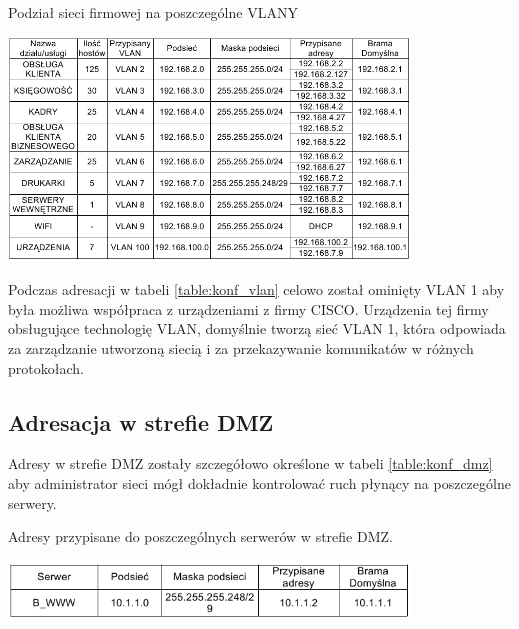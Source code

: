 \documentclass{report}
\begin{document}
\begin{table}[H]
\caption{Podział sieci firmowej na poszczególne VLANY}
\label{table:konf_vlan}
 \centering
      \includegraphics[width=0.8\textwidth]{./obrazki/ip/ip_vlan.png}
\end{table}

Podczas adresacji w tabeli \ref{table:konf_vlan} celowo został ominięty VLAN 1 aby była możliwa współpraca z urządzeniami z firmy CISCO.
Urządzenia tej firmy  obsługujące technologię VLAN, domyślnie tworzą sieć VLAN 1, która odpowiada za zarządzanie utworzoną siecią i za
 przekazywanie komunikatów w różnych protokołach.

\subsection{Adresacja w strefie DMZ}
Adresy w strefie DMZ zostały szczegółowo określone w tabeli \ref{table:konf_dmz} aby administrator sieci mógł dokładnie kontrolować ruch płynący na poszczególne serwery.
\begin{table}[H]
\caption{Adresy przypisane do poszczególnych serwerów w strefie DMZ.}
\label{table:konf_dmz}
 \centering
      \includegraphics[width=0.8\textwidth]{./obrazki/ip/ip_dmz.png}
\end{table}
\end{document}
